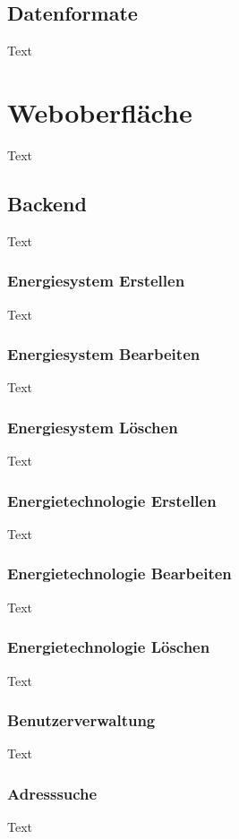 \subsection{Datenformate}
Text



\section{Weboberfläche}
Text

\subsection{Backend}
Text
\subsubsection{Energiesystem Erstellen}
Text

\subsubsection{Energiesystem Bearbeiten}
Text

\subsubsection{Energiesystem Löschen}
Text

\subsubsection{Energietechnologie Erstellen}
Text

\subsubsection{Energietechnologie Bearbeiten}
Text

\subsubsection{Energietechnologie Löschen}
Text

\subsubsection{Benutzerverwaltung}
Text

\subsubsection{Adresssuche}
Text


